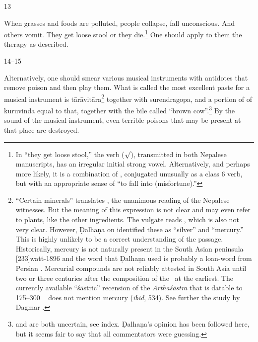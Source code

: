 \begin{translation}
\item [13]  

When grasses and foods are  polluted, people collapse, fall
unconscious. And others vomit. They get  loose 
stool or they  die.\footnote{In “they get loose stool,” the verb
     ($\surd$), transmitted in both Nepalese
    manuscripts, has an irregular initial strong vowel. Alternatively, and
    perhaps more likely, it is a combination of ,
    conjugated unusually as a class 6 verb, but with an appropriate sense
    of “to fall into (misfortune).”}  One should apply to them the therapy
    as described.

\item [14--15]  

Alternatively, one should smear  various musical instruments with
antidotes that remove poison and then play  them. What is called the
most  excellent paste for a musical instrument is
\gls{tārāvitāra}\footnote{“Certain  minerals” translates
    , the unanimous  reading of the Nepalese  witnesses.
    But the meaning of this expression is not  clear and may even refer to
    plants, like the other ingredients.  The vulgate  reads ,  which is also not very clear.  However, Ḍalhaṇa on
     identified  these as “silver” and “mercury.” This is
    highly unlikely  to be a correct understanding of  the passage.
    Historically, mercury is not  naturally present in the South  Asian
    peninsula [233]{watt-1896}  and the word  that
    Ḍalhaṇa used is probably a loan-word from  Persian \citep[sub
    \emph{paranda, parranda}][244b]{stei-pers}. Mercurial compounds are
    not  reliably attested in South Asia until two or three  centuries
    after the composition  of the \SS\ at the earliest.  The currently
    available  “śāstric” recension of the  \emph{Arthaśāstra} that is
    datable to 175--300 \CE\  \citep[29--31]{oliv-2013} does  not mention
    mercury (\emph{ibid}, 534). See further the study by  Dagmar \citet[17,
    \emph{et passim}]{wuja-2013b}.}  together with  \gls{surendragopa},
    and a  portion of of \gls{kuruvinda} equal to that,  together with the
    bile called  “brown cow”.\footnote{  and
         are both  uncertain, see index. Ḍalhaṇa's opinion has
        been followed here, but it  seems fair to say that all commentators
        were  guessing.} By the sound of  the musical instrument, even
        terrible poisons that may be present  at that place are destroyed.


\end{translation}
